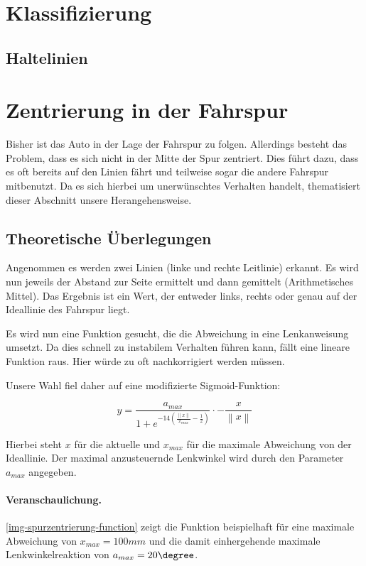 \documentclass[a4paper,12pt]{report}
\begin{document}
\section{Klassifizierung}

\subsection{Haltelinien}

\section{Zentrierung in der Fahrspur}

	Bisher ist das Auto in der Lage der Fahrspur zu folgen.
	Allerdings besteht das Problem, dass es sich nicht in der Mitte der Spur zentriert.
	Dies führt dazu, dass es oft bereits auf den Linien fährt und teilweise sogar die andere Fahrspur mitbenutzt.
	Da es sich hierbei um unerwünschtes Verhalten handelt, thematisiert dieser Abschnitt unsere Herangehensweise.

\subsection{Theoretische Überlegungen}

	Angenommen es werden zwei Linien (linke und rechte Leitlinie) erkannt.
	Es wird nun jeweils der Abstand zur Seite ermittelt und dann gemittelt (Arithmetisches Mittel).
	Das Ergebnis ist ein Wert, der entweder links, rechts oder genau auf der Ideallinie des Fahrspur liegt.

	Es wird nun eine Funktion gesucht, die die Abweichung in eine Lenkanweisung umsetzt.
	Da dies schnell zu instabilem Verhalten führen kann, fällt eine lineare Funktion raus.
	Hier würde zu oft nachkorrigiert werden müssen.

	Unsere Wahl fiel daher auf eine modifizierte Sigmoid-Funktion:

		\[y=\frac{a_{max}}{1 + e^{-14\left( \frac{\left\|x\right\|}{x_{max}} - \frac{1}{2} \right)}} \cdot -\frac{x}{\left\|x\right\|}\]

	Hierbei steht $x$ für die aktuelle und $x_{max}$ für die maximale Abweichung von der Ideallinie.
	Der maximal anzusteuernde Lenkwinkel wird durch den Parameter $a_{max}$ angegeben.

	\paragraph{Veranschaulichung.} \autoref{img-spurzentrierung-function} zeigt die Funktion beispielhaft für eine maximale Abweichung von $x_{max} = 100mm$ und die damit einhergehende maximale Lenkwinkelreaktion von $a_{max} = 20\degree$.
\end{document}
